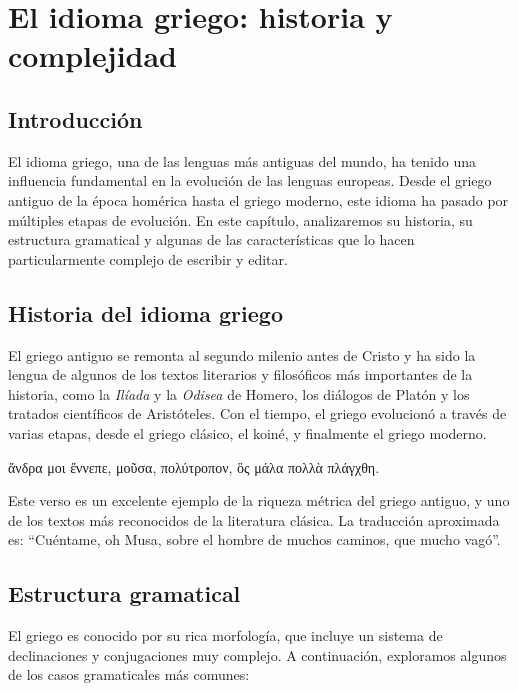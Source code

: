 \chapter{El idioma griego: historia y complejidad}

\section{Introducción}

El idioma griego, una de las lenguas más antiguas del mundo, ha tenido una influencia fundamental en la evolución de las lenguas europeas. Desde el griego antiguo de la época homérica hasta el griego moderno, este idioma ha pasado por múltiples etapas de evolución. En este capítulo, analizaremos su historia, su estructura gramatical y algunas de las características que lo hacen particularmente complejo de escribir y editar.

\section{Historia del idioma griego}

El griego antiguo se remonta al segundo milenio antes de Cristo y ha sido la lengua de algunos de los textos literarios y filosóficos más importantes de la historia, como la \emph{Ilíada} y la \emph{Odisea} de Homero, los diálogos de Platón y los tratados científicos de Aristóteles. Con el tiempo, el griego evolucionó a través de varias etapas, desde el griego clásico, el koiné, y finalmente el griego moderno.

ἄνδρα μοι ἔννεπε, μοῦσα, πολύτροπον, ὃς μάλα πολλὰ πλάγχθη.

Este verso es un excelente ejemplo de la riqueza métrica del griego antiguo, y uno de los textos más reconocidos de la literatura clásica. La traducción aproximada es: \enquote{Cuéntame, oh Musa, sobre el hombre de muchos caminos, que mucho vagó}.

\section{Estructura gramatical}

El griego es conocido por su rica morfología, que incluye un sistema de declinaciones y conjugaciones muy complejo. A continuación, exploramos algunos de los casos gramaticales más comunes:

